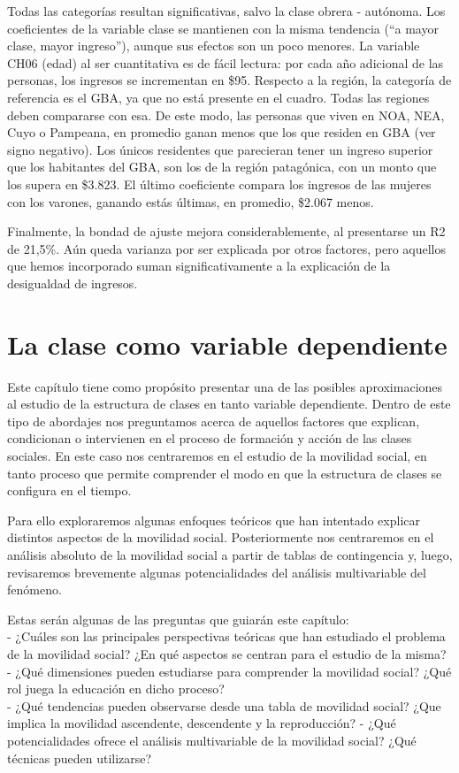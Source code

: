 \documentclass[
]{book}
\begin{document}
Todas las categorías resultan significativas, salvo la clase obrera - autónoma. Los coeficientes de la variable clase se mantienen con la misma tendencia (``a mayor clase, mayor ingreso''), aunque sus efectos son un poco menores. La variable CH06 (edad) al ser cuantitativa es de fácil lectura: por cada año adicional de las personas, los ingresos se incrementan en \$95. Respecto a la región, la categoría de referencia es el GBA, ya que no está presente en el cuadro. Todas las regiones deben compararse con esa. De este modo, las personas que viven en NOA, NEA, Cuyo o Pampeana, en promedio ganan menos que los que residen en GBA (ver signo negativo). Los únicos residentes que parecieran tener un ingreso superior que los habitantes del GBA, son los de la región patagónica, con un monto que los supera en \$3.823. El último coeficiente compara los ingresos de las mujeres con los varones, ganando estás últimas, en promedio, \$2.067 menos.

Finalmente, la bondad de ajuste mejora considerablemente, al presentarse un R2 de 21,5\%. Aún queda varianza por ser explicada por otros factores, pero aquellos que hemos incorporado suman significativamente a la explicación de la desigualdad de ingresos.

\hypertarget{dependiente}{%
\chapter{La clase como variable dependiente}\label{dependiente}}

Este capítulo tiene como propósito presentar una de las posibles aproximaciones al estudio de la estructura de clases en tanto variable dependiente. Dentro de este tipo de abordajes nos preguntamos acerca de aquellos factores que explican, condicionan o intervienen en el proceso de formación y acción de las clases sociales. En este caso nos centraremos en el estudio de la movilidad social, en tanto proceso que permite comprender el modo en que la estructura de clases se configura en el tiempo.

Para ello exploraremos algunas enfoques teóricos que han intentado explicar distintos aspectos de la movilidad social. Posteriormente nos centraremos en el análisis absoluto de la movilidad social a partir de tablas de contingencia y, luego, revisaremos brevemente algunas potencialidades del análisis multivariable del fenómeno.

Estas serán algunas de las preguntas que guiarán este capítulo:\\
- ¿Cuáles son las principales perspectivas teóricas que han estudiado el problema de la movilidad social? ¿En qué aspectos se centran para el estudio de la misma?\\
- ¿Qué dimensiones pueden estudiarse para comprender la movilidad social? ¿Qué rol juega la educación en dicho proceso?\\
- ¿Qué tendencias pueden observarse desde una tabla de movilidad social? ¿Que implica la movilidad ascendente, descendente y la reproducción?
- ¿Qué potencialidades ofrece el análisis multivariable de la movilidad social? ¿Qué técnicas pueden utilizarse?
\end{document}
